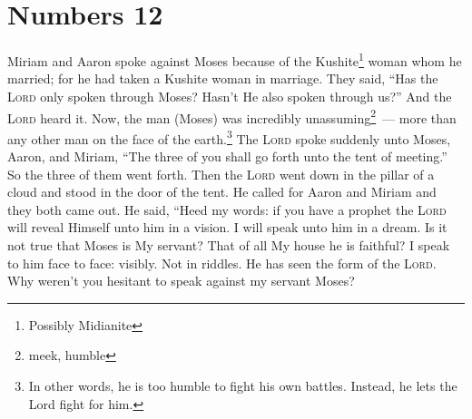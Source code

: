 \section{Numbers 12}\label{Numbers 12}
\begin{enumerate}
     Miriam and Aaron spoke against Moses because of the Kushite\footnote{Possibly Midianite} woman whom he married; for he had taken a Kushite woman in marriage.%
     They said, ``Has the \textsc{Lord} only spoken through Moses? Hasn't He also spoken through us?'' And the \textsc{Lord} heard it.%
     Now, the man (Moses) was incredibly unassuming\footnote{meek, humble}~--- more than any other man on the face of the earth.\footnote{In other words, he is too humble to fight his own battles. Instead, he lets the Lord fight for him.}%
     The \textsc{Lord} spoke suddenly unto Moses, Aaron, and Miriam, ``The three of you shall go forth unto the tent of meeting.'' So the three of them went forth.%
     Then the \textsc{Lord} went down in the pillar of a cloud and stood in the door of the tent. He called for Aaron and Miriam and they both came out.%
     He said, ``Heed my words: if you have a prophet the \textsc{Lord} will reveal Himself unto him in a vision. I will speak unto him in a dream.%
     Is it not true that Moses is My servant? That of all My house he is faithful?%
     I speak to him face to face: visibly. Not in riddles. He has seen the form of the \textsc{Lord}. Why weren't you hesitant to speak against my servant Moses?%
\end{enumerate}
